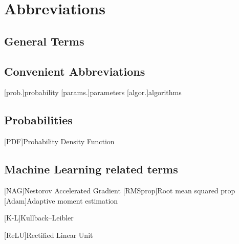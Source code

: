 
\chapter*{Abbreviations}
\section*{General Terms}
\begin{acronym}[LONGEST]
\end{acronym}

\section*{Convenient Abbreviations}
\begin{acronym}[LONGEST]
	[prob.]{probability}
	[params.]{parameters}
	[algor.]{algorithms}
\end{acronym}

\section*{Probabilities}
\begin{acronym}[LONGEST]
	[PDF]{Probability Density Function}
\end{acronym}

\section*{Machine Learning related terms}
\begin{acronym}[LONGEST]
	
	[NAG]{Nestorov Accelerated Gradient}
	[RMSprop]{Root mean squared prop}
	[Adam]{Adaptive moment estimation}
	
	[K-L]{Kullback–Leibler}
	
	[ReLU]{Rectified Linear Unit}
\end{acronym}